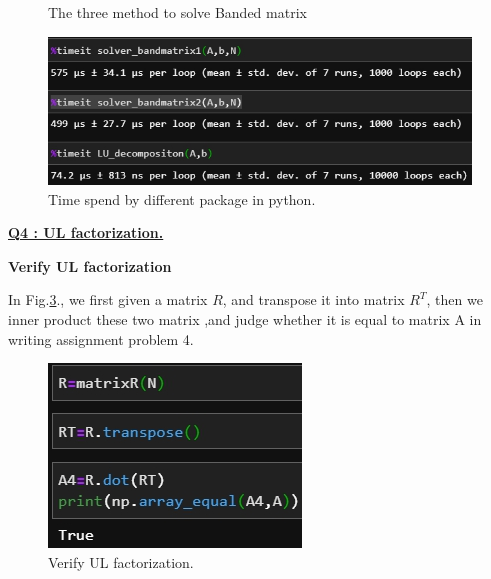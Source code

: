 \documentclass{article}
\begin{document}
\begin{figure}[]
{        \label{fig3_sol2} 
    }
    \caption{The three method to solve Banded matrix}
    \label{fig3}
\end{figure}
\begin{figure}[]
    \centering 
	\includegraphics[scale=0.45]{pro3_time.jpg}
	\caption{Time spend by different package in python.} %
	\label{fig3_time} %
\end{figure}
\underline{\textbf{Q4 : UL factorization.\\}}

\textbf{Verify UL factorization}

In Fig.\ref{fig4_verify}., we first given a matrix $R$, and transpose it into matrix $R^T$, then we inner product these two matrix ,and judge whether it is equal to matrix A in writing assignment problem 4.\\
\begin{figure}[h]
    \centering 
	\includegraphics[scale=0.5]{pro4_verify.jpg}
	\caption{Verify UL factorization.} %
	\label{fig4_verify} %
\end{figure}
\end{document}
